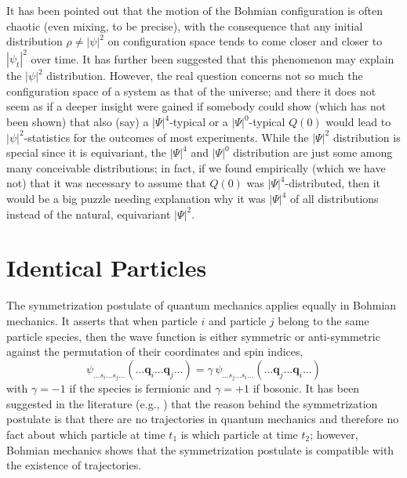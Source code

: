 \documentclass[12pt]{article}
\newcommand{\be}{\begin{equation}}
\newcommand{\ee}{\end{equation}}
\newcommand{\vq}{\boldsymbol{q}}
\begin{document}
It has been pointed out \cite{VW} that the motion of the Bohmian configuration is often chaotic (even mixing, to be precise), with the consequence that any initial distribution $\rho\neq |\psi|^2$ on configuration space tends to come closer and closer to $|\psi_t|^2$ over time. It has further been suggested \cite{Bohm52,VW} that this phenomenon may explain the $|\psi|^2$ distribution. However, the real question concerns not so much the configuration space of a system as that of the universe; and there it does not seem as if a deeper insight were gained if somebody could show (which has not been shown) that also (say) a $|\Psi|^4$-typical or a $|\Psi|^0$-typical $Q(0)$ would lead to $|\psi|^2$-statistics for the outcomes of most experiments. While the $|\Psi|^2$ distribution is special since it is equivariant, the $|\Psi|^4$ and $|\Psi|^0$ distribution are just some among many conceivable distributions; in fact, if we found empirically (which we have not) that it was necessary to assume that $Q(0)$ was $|\Psi|^4$-distributed, then it would be a big puzzle needing explanation why it was $|\Psi|^4$ of all distributions instead of the natural, equivariant $|\Psi|^2$.


\section{Identical Particles}

The symmetrization postulate of quantum mechanics applies equally in Bohmian mechanics. It asserts that when particle $i$ and particle $j$ belong to the same particle species, then the wave function is either symmetric or anti-symmetric against the permutation of their coordinates and spin indices,
\be
\psi_{...s_i...s_j...}(...\vq_i...\vq_j...) = \gamma\, \psi_{...s_j...s_i...}(...\vq_j...\vq_i...)
\ee
with $\gamma=-1$ if the species is fermionic and $\gamma=+1$ if bosonic. It has been suggested in the literature (e.g., \cite[p.~227]{LL}) that the reason behind the symmetrization postulate is that there are no trajectories in quantum mechanics and therefore no fact about which particle at time $t_1$ is which particle at time $t_2$; however, Bohmian mechanics shows that the symmetrization postulate is compatible with the existence of trajectories. 
\end{document}
